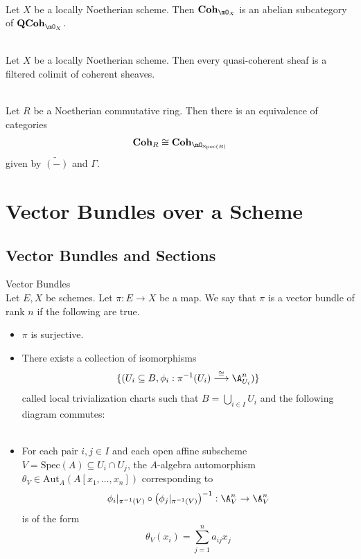 \documentclass[a4paper]{article}
\begin{document}
\begin{prp}{}{}\\
Let $X$ be a locally Noetherian scheme. Then $\bold{Coh}_{\mO_X}$ is an abelian subcategory of $\bold{QCoh}_{\mO_X}$. 
\end{prp}

\begin{prp}{}{}\\
Let $X$ be a locally Noetherian scheme. Then every quasi-coherent sheaf is a filtered colimit of coherent sheaves. 
\end{prp}

\begin{prp}{}{}\\
Let $R$ be a Noetherian commutative ring. Then there is an equivalence of categories $$\bold{Coh}_R\cong\bold{Coh}_{\mO_{\text{Spec}(R)}}$$ given by $\widetilde{(-)}$ and $\Gamma$. 
\end{prp}

\pagebreak
\section{Vector Bundles over a Scheme}
\subsection{Vector Bundles and Sections}
\begin{defn}{Vector Bundles}{}\\
Let $E,X$ be schemes. Let $\pi:E\to X$ be a map. We say that $\pi$ is a vector bundle of rank $n$ if the following are true. 
\begin{itemize}
\item $\pi$ is surjective. 
\item There exists a collection of isomorphisms $$\{(U_i\subseteq B,\phi_i:\pi^{-1}(U_i)\overset{\cong}{\longrightarrow} \A_{U_i}^n)\}$$ called local trivialization charts such that $B=\bigcup_{i\in I}U_i$ and the following diagram commutes: \\
\\
\item For each pair $i,j\in I$ and each open affine subscheme $V=\text{Spec}(A)\subseteq U_i\cap U_j$, the $A$-algebra automorphism $\theta_V\in\text{Aut}_A(A[x_1,\dots,x_n])$ corresponding to $$\phi_i|_{\pi^{-1}(V)}\circ\left(\phi_j|_{\pi^{-1}(V)}\right)^{-1}:\A_V^n\to\A_V^n$$ is of the form $$\theta_V(x_i)=\sum_{j=1}^na_{ij}x_j$$
\end{itemize}
\end{defn}
\end{document}

